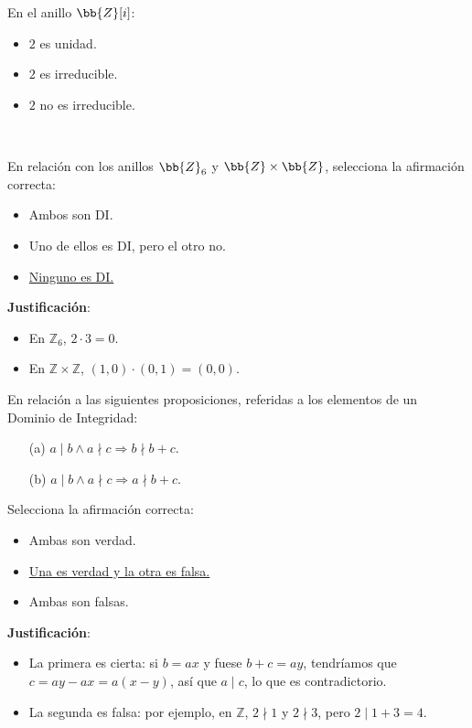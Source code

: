 \begin{ejercicio}
    En el anillo $\bb{Z}[i]$:
    \begin{itemize}
        \item $2$ es unidad.
        \item $2$ es irreducible.
        \item $2$ no es irreducible.
    \end{itemize}
\end{ejercicio}

\newpage
\ %
\resetearcontador

\begin{ejercicio}
    En relación con los anillos $\bb{Z}_6$ y $\bb{Z} \times \bb{Z}$, selecciona la afirmación correcta:
    \begin{itemize}
        \item Ambos son DI.
        \item Uno de ellos es DI, pero el otro no.
        \item \underline{Ninguno es DI.}
    \end{itemize}

    \noindent
    \textbf{Justificación}:
    \begin{itemize}
        \item En $\mathbb{Z}_6$, $2\cdot 3=0$.
        \item En $\mathbb{Z}\times \mathbb{Z}$, $(1,0)\cdot (0,1)=(0,0)$.
    \end{itemize}
\end{ejercicio}

\begin{ejercicio}
    En relación a las siguientes proposiciones, referidas a los elementos de un Dominio de Integridad:
    \begin{enumerate}
        \item [(a)] $a\mid b \land a \nmid c \Rightarrow b \nmid b+c$.
        \item [(b)] $a\mid b \land a \nmid c \Rightarrow a \nmid b+c$.
    \end{enumerate}
    Selecciona la afirmación correcta:
    \begin{itemize}
        \item Ambas son verdad.
        \item \underline{Una es verdad y la otra es falsa.}
        \item Ambas son falsas.
    \end{itemize}

    \noindent
    \textbf{Justificación}:
    \begin{itemize}
        \item La primera es cierta: si $b=ax$ y fuese $b+c=ay$, tendríamos que $c=ay-ax=a(x-y)$, así que $a\mid c$, lo que es contradictorio.
        \item La segunda es falsa: por ejemplo, en $\mathbb{Z}$, $2\nmid 1$ y $2\nmid 3$, pero $2\mid 1+3=4$.
    \end{itemize}
\end{ejercicio}

